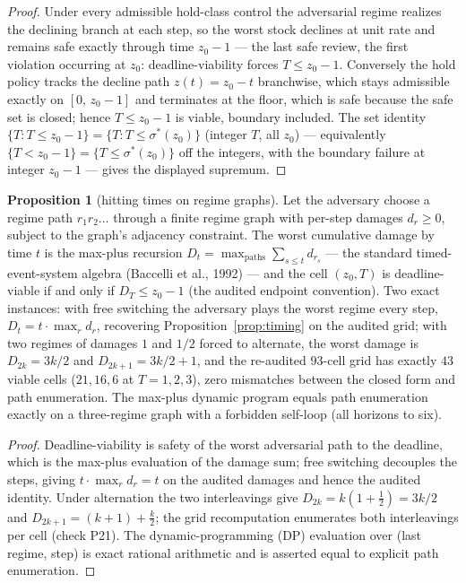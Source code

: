 \documentclass[10pt,twocolumn]{article}
\theoremstyle{definition}
\newtheorem{proposition}{Proposition}
\begin{document}
\begin{proof}
Under every admissible hold-class control the adversarial regime realizes
the declining branch at each step, so the worst stock declines at unit
rate and remains safe exactly through time \(z_0 - 1\) --- the last
safe review, the first violation occurring at \(z_0\):
deadline-viability forces \(T \le z_0 - 1\). Conversely
the hold policy tracks the decline path \(z(t) = z_0 - t\) branchwise,
which stays admissible exactly on \([0,\, z_0 - 1]\) and terminates at
the floor, which is safe because the safe set is closed; hence
\(T \le z_0 - 1\) is viable, boundary included. The set identity
\(\{T : T \le z_0 - 1\} = \{T : T \le \sigma^{*}(z_0)\}\)
(integer \(T\), all \(z_0\)) --- equivalently \(\{T < z_0 - 1\} =
\{T \le \sigma^{*}(z_0)\}\) off the integers, with the boundary
failure at integer \(z_0 - 1\) --- gives the displayed supremum.
\end{proof}

\begin{proposition}[hitting times on regime graphs]\label{prop:regime}
Let the adversary choose a regime path \(r_1 r_2 \dots\) through a
finite regime graph with per-step damages \(d_r \ge 0\), subject to
the graph's adjacency constraint. The worst cumulative damage by time
\(t\) is the max-plus recursion
\(D_t = \max_{\text{paths}} \sum_{s \le t} d_{r_s}\) --- the standard
timed-event-system algebra (Baccelli et al., 1992) --- and the cell
\((z_0, T)\) is deadline-viable if and only if \(D_T \le z_0 - 1\)
(the audited endpoint convention). Two exact instances: with free
switching the adversary plays the worst regime every step, \(D_t = t
\cdot \max_r d_r\), recovering Proposition~\ref{prop:timing} on the
audited grid; with two regimes of damages \(1\) and \(1/2\) forced to
alternate, the worst damage is \(D_{2k} = 3k/2\) and \(D_{2k+1} = 3k/2
+ 1\), and the re-audited \(93\)-cell grid has exactly \(43\) viable
cells (\(21, 16, 6\) at \(T = 1, 2, 3\)), zero mismatches between the
closed form and path enumeration. The max-plus dynamic program equals
path enumeration exactly on a three-regime graph with a forbidden
self-loop (all horizons to six).
\end{proposition}

\begin{proof}
Deadline-viability is safety of the worst adversarial path to the
deadline, which is the max-plus evaluation of the damage sum; free
switching decouples the steps, giving \(t \cdot \max_r d_r = t\) on
the audited damages and hence the audited identity. Under alternation
the two interleavings give \(D_{2k} = k(1 + \tfrac12) = 3k/2\) and
\(D_{2k+1} = (k+1) + \tfrac{k}{2}\); the grid recomputation enumerates
both interleavings per cell (check P21). The dynamic-programming (DP) evaluation over
(last regime, step) is exact rational arithmetic and is asserted equal
to explicit path enumeration.
\end{proof}
\end{document}
